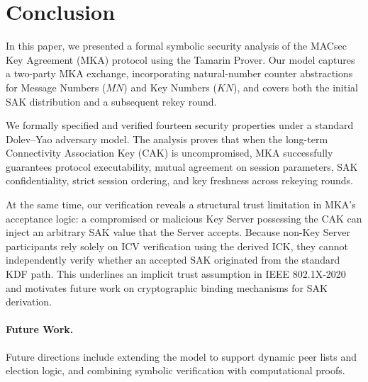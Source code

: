 \section{Conclusion}
\label{sec:conclusion}

In this paper, we presented a formal symbolic security analysis of the MACsec Key Agreement (MKA) protocol using the Tamarin Prover. Our model captures a two-party MKA exchange, incorporating natural-number counter abstractions for Message Numbers ($MN$) and Key Numbers ($KN$), and covers both the initial SAK distribution and a subsequent rekey round.

We formally specified and verified fourteen security properties under a standard Dolev--Yao adversary model. The analysis proves that when the long-term Connectivity Association Key (CAK) is uncompromised, MKA successfully guarantees protocol executability, mutual agreement on session parameters, SAK confidentiality, strict session ordering, and key freshness across rekeying rounds.

At the same time, our verification reveals a structural trust limitation in MKA's acceptance logic: a compromised or malicious Key Server possessing the CAK can inject an arbitrary SAK value that the Server accepts. Because non-Key Server participants rely solely on ICV verification using the derived ICK, they cannot independently verify whether an accepted SAK originated from the standard KDF path. This underlines an implicit trust assumption in IEEE 802.1X-2020 and motivates future work on cryptographic binding mechanisms for SAK derivation.

\paragraph{Future Work.} Future directions include extending the model to support dynamic peer lists and election logic, and combining symbolic verification with computational proofs.